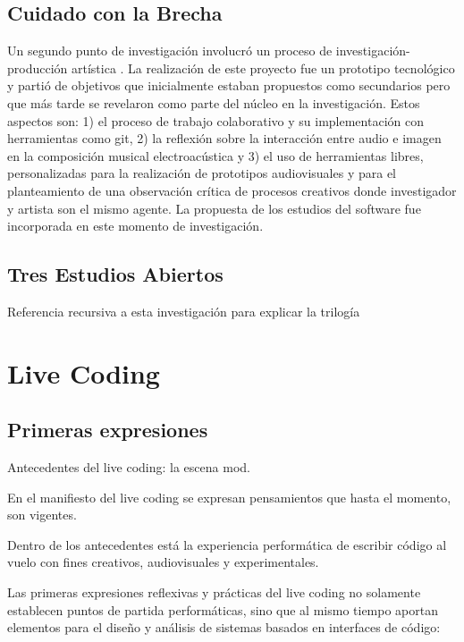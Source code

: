 \subsection{Cuidado con la Brecha}

Un segundo punto de investigación involucró un proceso de investigación-producción artística \citep{ocelotlMas}. La realización de este proyecto fue un prototipo tecnológico y partió de objetivos que inicialmente estaban propuestos como secundarios pero que más tarde se revelaron como parte del núcleo en la investigación. Estos aspectos son: 1) el proceso de trabajo colaborativo y su implementación con herramientas como git, 2) la reflexión sobre la interacción entre audio e imagen en la composición musical electroacústica y 3) el uso de herramientas libres, personalizadas para la realización de prototipos audiovisuales y para el planteamiento de una observación crítica de procesos creativos donde investigador y artista son el mismo agente. La propuesta de los estudios del software fue incorporada en este momento de investigación. 

\subsection{Tres Estudios Abiertos}

Referencia recursiva a esta investigación para explicar la trilogía


\section{Live Coding}


\subsection{Primeras expresiones}

Antecedentes del live coding: la escena mod.

En el manifiesto del live coding se expresan pensamientos que hasta el momento, son vigentes. 

Dentro de los antecedentes está la experiencia performática de escribir código al vuelo con fines creativos, audiovisuales y experimentales.

Las primeras expresiones reflexivas y prácticas del live coding no solamente establecen puntos de partida performáticas, sino que al mismo tiempo aportan elementos para el diseño y análisis de sistemas basados en interfaces de código:

